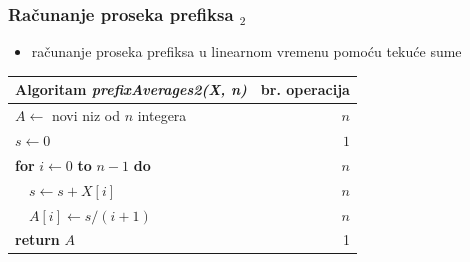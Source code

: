 \documentclass[compress,aspectratio=169]{beamer}
\begin{document}
\begin{frame}[fragile]
  \frametitle{Računanje proseka prefiksa $_2$}
  \begin{itemize}
    \item računanje proseka prefiksa u linearnom vremenu pomoću tekuće sume
  \end{itemize}
  \begin{center}
    \begin{tabular}{l|r}
      \textbf{Algoritam} \textit{prefixAverages2(X, n)} & \textbf{br. operacija} \\ \hline
      $A \leftarrow$ novi niz od $n$ integera & $n$ \\
      $s \leftarrow 0$ & $1$ \\
      \textbf{for} $i \leftarrow 0$ \textbf{to} $n - 1$ \textbf{do} & $n$ \\
      \ \ $s \leftarrow s + X[i]$ & $n$ \\
      \ \ $A[i] \leftarrow s/(i+1)$ & $n$ \\
      \textbf{return} $A$ & 1
    \end{tabular}
  \end{center}
\end{frame}
\end{document}
